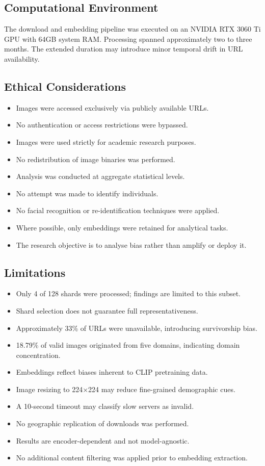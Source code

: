 \subsection{Computational Environment}

The download and embedding pipeline was executed on an NVIDIA RTX 3060 Ti GPU with 64GB system RAM. Processing spanned approximately two to three months. The extended duration may introduce minor temporal drift in URL availability.

\subsection{Ethical Considerations}

\begin{itemize}
	\item Images were accessed exclusively via publicly available URLs.
	\item No authentication or access restrictions were bypassed.
	\item Images were used strictly for academic research purposes.
	\item No redistribution of image binaries was performed.
	\item Analysis was conducted at aggregate statistical levels.
	\item No attempt was made to identify individuals.
	\item No facial recognition or re-identification techniques were applied.
	\item Where possible, only embeddings were retained for analytical tasks.
	\item The research objective is to analyse bias rather than amplify or deploy it.
\end{itemize}

\subsection{Limitations}

\begin{itemize}
	\item Only 4 of 128 shards were processed; findings are limited to this subset.
	\item Shard selection does not guarantee full representativeness.
	\item Approximately 33\% of URLs were unavailable, introducing survivorship bias.
	\item 18.79\% of valid images originated from five domains, indicating domain concentration.
	\item Embeddings reflect biases inherent to CLIP pretraining data.
	\item Image resizing to 224$\times$224 may reduce fine-grained demographic cues.
	\item A 10-second timeout may classify slow servers as invalid.
	\item No geographic replication of downloads was performed.
	\item Results are encoder-dependent and not model-agnostic.
	\item No additional content filtering was applied prior to embedding extraction.
\end{itemize}

